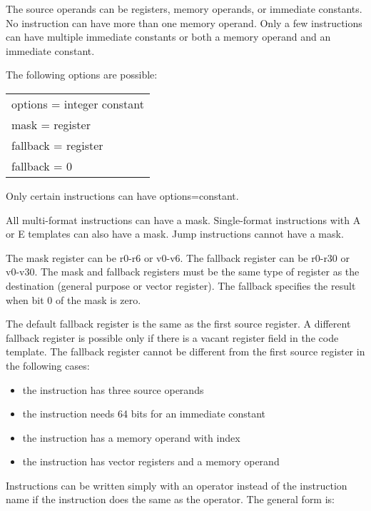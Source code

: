 \documentclass[forwardcom.tex]{subfiles}
\begin{document}
The source operands can be registers, memory operands, or immediate constants. 
No instruction can have more than one memory operand. Only a few instructions can have multiple immediate constants or both a memory operand and an immediate constant.
\vspace{2mm}

The following options are possible:\\
\begin{tabular}{|p{140mm}|}
\hline
options = integer constant\\
mask = register\\
fallback = register\\
fallback = 0\\
\hline
\end{tabular}
\vspace{2mm}

Only certain instructions can have options=constant.
\vspace{2mm}

All multi-format instructions can have a mask. Single-format instructions with A or E templates can also have a mask. Jump instructions cannot have a mask.
\vspace{2mm}

The mask register can be r0-r6 or v0-v6. The fallback register can be r0-r30 or v0-v30.
The mask and fallback registers must be the same type of register as the destination (general purpose or vector register). The fallback specifies the result when bit 0 of the mask is zero.
\vspace{2mm}

The default fallback register is the same as the first source register. A different fallback register is  possible only if there is a vacant register field in the code template. 
The fallback register cannot be different from the first source register in the following cases:
\begin{itemize}
\item the instruction has three source operands
\item the instruction needs 64 bits for an immediate constant
\item the instruction has a memory operand with index
\item the instruction has vector registers and a memory operand
\end{itemize}
\vspace{2mm}

Instructions can be written simply with an operator instead of the instruction name if the instruction does the same as the operator. The general form is:
\vspace{2mm}
\end{document}
